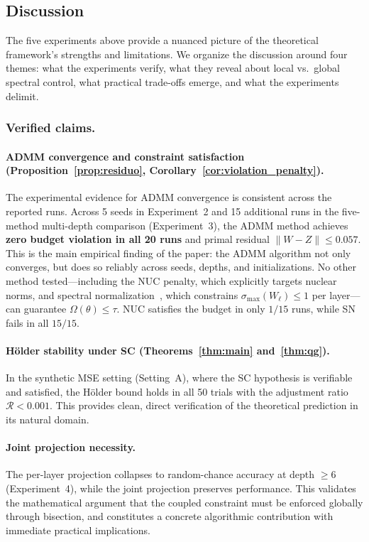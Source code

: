 \documentclass[a4paper,fleqn]{cas-sc}
\theoremstyle{remark}
\theoremstyle{definition}
\begin{document}
\subsection{Discussion}\label{sec:discussion}

The five experiments above provide a nuanced picture of the theoretical framework's strengths and limitations. We organize the discussion around four themes: what the experiments verify, what they reveal about local vs.\ global spectral control, what practical trade-offs emerge, and what the experiments delimit.

\subsubsection{Verified claims.}

\paragraph{ADMM convergence and constraint satisfaction (Proposition~\ref{prop:residuo}, Corollary~\ref{cor:violation_penalty}).}
The experimental evidence for ADMM convergence is consistent across the reported runs. Across 5 seeds in Experiment~2 and 15 additional runs in the five-method multi-depth comparison (Experiment~3), the ADMM method achieves \textbf{zero budget violation in all 20 runs} and primal residual $\|W-Z\|\le 0.057$. This is the main empirical finding of the paper: the ADMM algorithm not only converges, but does so reliably across seeds, depths, and initializations. No other method tested---including the NUC penalty, which explicitly targets nuclear norms, and spectral normalization~\cite{Miyato2018SpectralNorm}, which constrains $\sigma_{\max}(W_\ell)\le 1$ per layer---can guarantee $\Omega(\theta)\le\tau$. NUC satisfies the budget in only $1/15$ runs, while SN fails in all $15/15$.

\paragraph{Hölder stability under SC (Theorems~\ref{thm:main} and~\ref{thm:qg}).}
In the synthetic MSE setting (Setting~A), where the SC hypothesis is verifiable and satisfied, the Hölder bound holds in all 50 trials with the adjustment ratio $\mathcal{R}<0.001$. This provides clean, direct verification of the theoretical prediction in its natural domain.

\paragraph{Joint projection necessity.}
The per-layer projection collapses to random-chance accuracy at depth $\ge 6$ (Experiment~4), while the joint projection preserves performance. This validates the mathematical argument that the coupled constraint must be enforced globally through bisection, and constitutes a concrete algorithmic contribution with immediate practical implications.
\end{document}
